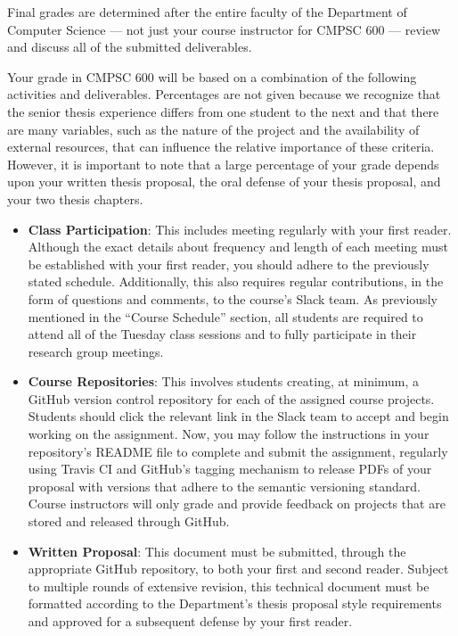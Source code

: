 \documentclass[11pt]{article}
\begin{document}
Final grades are determined after the entire faculty of the Department of
Computer Science --- not just your course instructor for CMPSC 600 --- review
and discuss all of the submitted deliverables.

Your grade in CMPSC 600 will be based on a combination of the following
activities and deliverables. Percentages are not given because we recognize that
the senior thesis experience differs from one student to the next and that there
are many variables, such as the nature of the project and the availability of
external resources, that can influence the relative importance of these
criteria. However, it is important to note that a large percentage of your grade
depends upon your written thesis proposal, the oral defense of your thesis
proposal, and your two thesis chapters.

\begin{itemize}
  \itemsep -.25em

  \item {\bf Class Participation}: This includes meeting regularly with your
    first reader. Although the exact details about frequency and length of each
    meeting must be established with your first reader, you should adhere to the
    previously stated schedule. Additionally, this also requires regular
    contributions, in the form of questions and comments, to the course's Slack
    team. As previously mentioned in the ``Course Schedule'' section, all
    students are required to attend all of the Tuesday class sessions and to
    fully participate in their research group meetings.

  \item {\bf Course Repositories}: This involves students creating, at minimum,
    a GitHub version control repository for each of the assigned course
    projects. Students should click the relevant link in the Slack team to
    accept and begin working on the assignment. Now, you may follow the
    instructions in your repository's README file to complete and submit the
    assignment, regularly using Travis CI and GitHub's tagging mechanism to
    release PDFs of your proposal with versions that adhere to the semantic
    versioning standard. Course instructors will only grade and provide feedback
    on projects that are stored and released through GitHub.

  \item {\bf Written Proposal}: This document must be submitted, through the
    appropriate GitHub repository, to both your first and second reader. Subject
    to multiple rounds of extensive revision, this technical document must be
    formatted according to the Department's thesis proposal style requirements
    and approved for a subsequent defense by your first reader.


\end{itemize}
\end{document}
